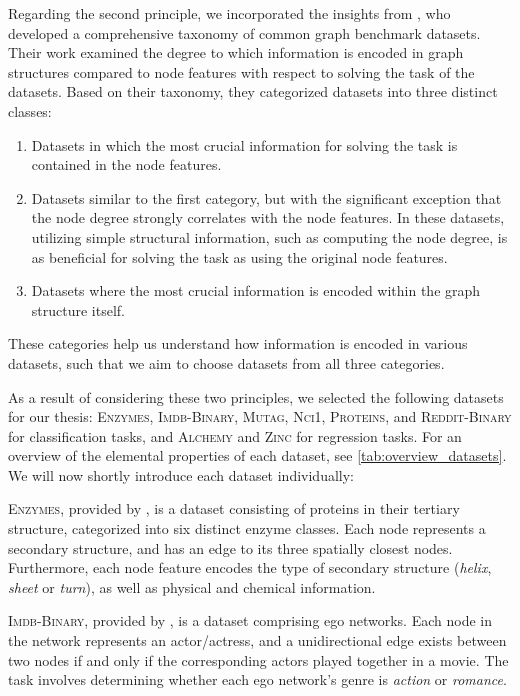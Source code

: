 Regarding the second principle, we incorporated the insights from \cite{Liu2022}, who developed a comprehensive taxonomy of common graph benchmark datasets. Their work examined the degree to which information is encoded in graph structures compared to node features with respect to solving the task of the datasets. Based on their taxonomy, they categorized datasets into three distinct classes:
\begin{enumerate}
	\item Datasets in which the most crucial information for solving the task is contained in the node features.
	\item Datasets similar to the first category, but with the significant exception that the node degree strongly correlates with the node features. In these datasets, utilizing simple structural information, such as computing the node degree, is as beneficial for solving the task as using the original node features.
	\item Datasets where the most crucial information is encoded within the graph structure itself.
\end{enumerate}
These categories help us understand how information is encoded in various datasets, such that we aim to choose datasets from all three categories.

As a result of considering these two principles, we selected the following datasets for our thesis: \textsc{Enzymes}, \textsc{Imdb-Binary}, \textsc{Mutag}, \textsc{Nci1}, \textsc{Proteins}, and \textsc{Reddit-Binary} for classification tasks, and \textsc{Alchemy} and \textsc{Zinc} for regression tasks. For an overview of the elemental properties of each dataset, see \cref{tab:overview_datasets}. We will now shortly introduce each dataset individually: \newline

\textsc{Enzymes}, provided by \cite{Borgwardt2005}, is a dataset consisting of proteins in their tertiary structure, categorized into six distinct enzyme classes. Each node represents a secondary structure, and has an edge to its three spatially closest nodes. Furthermore, each node feature encodes the type of secondary structure (\textit{helix}, \textit{sheet} or \textit{turn}), as well as physical and chemical information. \newline


\textsc{Imdb-Binary}, provided by \cite{Yanardag2015}, is a dataset comprising ego networks. Each node in the network represents an actor/actress, and a unidirectional edge exists between two nodes if and only if the corresponding actors played together in a movie. The task involves determining whether each ego network's genre is \textit{action} or \textit{romance}. \newline

